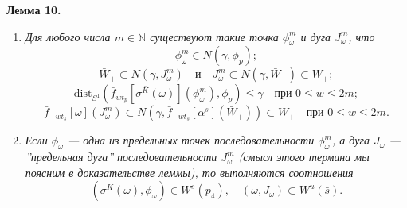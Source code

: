 \documentclass[12pt]{article}
\begin{document}
\textbf{Лемма 10.}
\begin{enumerate}
	\item[(10.a)] \textit{Для любого числа $m\in\mathbb{N}$ существуют такие точка $\phi^m_{\omega}$ и дуга $J^m_{\omega}$, что 
	\begin{equation}
	\label{2.7.15}
	\phi^m_{\omega}\in N(\gamma,\phi_p);
	\end{equation}
	\begin{equation}
	\label{2.7.16}
	\bar{W}_+\subset N(\gamma,J^m_{\omega})\quad\textrm{и}\quad J^m_{\omega}\subset N(\gamma,\bar{W}_+)\subset W_+;
  \end{equation}	
\begin{equation}
\label{2.7.17}
\mbox{dist}_{S^1}(\bar{f}_{wt_p}[\sigma^{\bar{K}}(\omega)](\phi^m_{\omega}),\phi_p)\leq\gamma\quad\textrm{при }0\leq w\leq 2m;
\end{equation}
	\begin{equation}
	\label{2.7.18}
	\bar{f}_{-wt_s}[\omega](J^m_{\omega})\subset N(\gamma,\bar{f}_{-wt_s}[\alpha^s](\bar{W}_+))\subset W_+\quad\textrm{при }0\leq w\leq 2m.
  \end{equation}
  }
  \item[(10.b)] \textit{Если $\phi_{\omega}$ --- одна из предельных точек последовательности $\phi^m_{\omega}$, а дуга $J_{\omega}$ --- ''предельная дуга'' последовательности $J^m_{\omega}$ (смысл этого термина мы поясним в доказательстве леммы), то выполняются соотношения
\begin{equation}
\label{2.7.19}
(\sigma^{\bar{K}}(\omega),\phi_{\omega})\in W^s(p_4),\quad (\omega, J_{\omega})\subset W^u(\bar{s}).
\end{equation}
}
\end{enumerate}
\end{document}
